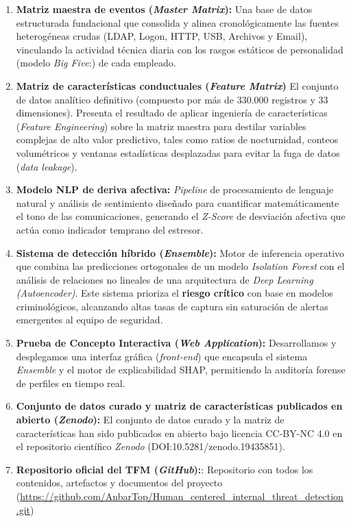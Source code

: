 \documentclass[IB]{TFUOC}%
\begin{document}
\begin{enumerate}
    \item \textbf{Matriz maestra de eventos (\textit{Master Matrix}):}\newline
    Una base de datos estructurada fundacional que consolida y alinea cronológicamente las fuentes heterogéneas crudas (LDAP, Logon, HTTP, USB, Archivos y Email), vinculando la actividad técnica diaria con los rasgos estáticos de personalidad (modelo \textit{Big Five}:) de cada empleado.
    \item \textbf{Matriz de características conductuales (\textit{Feature Matrix})}\newline
    El conjunto de datos analítico definitivo (compuesto por más de 330.000 registros y 33 dimensiones). Presenta el resultado de aplicar ingeniería de características (\textit{Feature Engineering}) sobre la matriz maestra para destilar variables complejas de alto valor predictivo, tales como ratios de nocturnidad, conteos volumétricos y ventanas estadísticas desplazadas para evitar la fuga de datos (\textit{data leakage}).
    \item \textbf{Modelo NLP de deriva afectiva:}\newline
    \textit{Pipeline} de procesamiento de lenguaje natural y análisis de sentimiento diseñado para cuantificar matemáticamente el tono de las comunicaciones, generando el \textit{Z-Score} de desviación afectiva que actúa como indicador temprano del estresor.
    \item  \textbf{Sistema de detección híbrido (\textit{Ensemble}):}\newline
    Motor de inferencia operativo que combina las predicciones ortogonales de un modelo \textit{Isolation Forest} con el análisis de relaciones no lineales de una arquitectura de \textit{Deep Learning (Autoencoder)}. Este sistema prioriza el \textbf{riesgo crítico} con base en modelos criminológicos, alcanzando altas tasas de captura sin saturación de alertas emergentes al equipo de seguridad.
    \item  \textbf{Prueba de Concepto Interactiva (\textit{Web Application}):}\newline
    Desarrollamos y desplegamos una interfaz gráfica (\textit{front-end}) que encapsula el sistema \textit{Ensemble} y el motor de explicabilidad SHAP, permitiendo la auditoría forense de perfiles en tiempo real.
    \item  \textbf{Conjunto de datos curado y matriz de características publicados en abierto (\textit{Zenodo}):}\newline
    El conjunto de datos curado y la matriz de características han sido publicados en abierto bajo licencia CC-BY-NC 4.0 en el repositorio científico \textit{Zenodo} (DOI:10.5281/zenodo.19435851).

    \item  \textbf{Repositorio oficial del TFM (\textit{GitHub}):}:\newline
    Repositorio con todos los contenidos, artefactos y documentos del proyecto (\url{https://github.com/AnbarTop/Human_centered_internal_threat_detection.git})
\end{enumerate}
\end{document}
